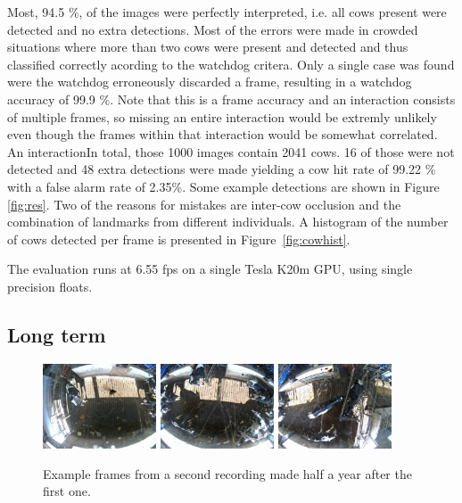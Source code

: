 \documentclass{cta-author}
\begin{document}
Most, 94.5 \%, of the images were perfectly interpreted, i.e. all cows present were detected and no extra detections.
Most of the errors were made in crowded situations where more than two cows were present and detected and thus classified correctly acording to the watchdog critera. Only a single case was found were the watchdog erroneously discarded a frame, resulting in a watchdog accuracy of 99.9 \%. Note that this is a frame accuracy and an interaction consists of multiple frames, so missing an entire interaction would be extremly unlikely even though the frames within that interaction would be somewhat correlated. An interactionIn total, those 1000 images contain 2041 cows. 16 of those were not detected and 48 extra detections were made yielding a cow hit rate of 99.22 \% with a false alarm rate of 2.35\%. Some example detections are shown in Figure \ref{fig:res}.
Two of the reasons for mistakes are inter-cow occlusion and the combination of landmarks from different individuals. A  
histogram of the number of cows detected per frame is presented in Figure~\ref{fig:cowhist}.

The evaluation runs at 6.55 fps on a single Tesla K20m GPU, using single precision floats.

\subsection{Long term}
\begin{figure}[tb]
\begin{center}
  \includegraphics[width=0.3\textwidth]{new-2.jpg}
  \includegraphics[width=0.3\textwidth]{new-1.jpg}
  \includegraphics[width=0.3\textwidth]{new-0.jpg}
\end{center}
  \caption{Example frames from a second recording made half a year after the first one.}
  \label{fig:new}
\end{figure}
\end{document}
